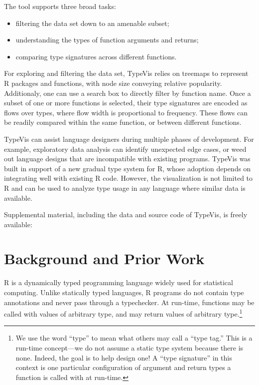 \documentclass{vgtc}                          %
\newcommand{\typevis}{{\sc TypeVis}\xspace}
\begin{document}
The tool supports three broad tasks:
\begin{itemize}
  \setlength\itemsep{0em}
  \item filtering the data set down to an amenable subset;
  \item understanding the types of function arguments and returns;
  \item comparing type signatures across different functions.
\end{itemize}
For exploring and filtering the data set,
\typevis relies on treemaps to represent R packages and functions,
with node size conveying relative popularity.
Additionaly, one can use a search box to directly filter
by function name.
Once a subset of one or more functions is selected,
their type signatures are encoded as flows over types,
where flow width is proportional to frequency.
These flows can be readily compared within the same function,
or between different functions.

\typevis can assist language designers during multiple phases of development.
For example, exploratory data analysis can identify unexpected edge cases,
or weed out language designs that are incompatible with existing programs.
\typevis was built in support of a new gradual type system for R,
whose adoption depends on integrating well with existing R code.
However, the visualization is not limited to R and can be used to
analyze type usage in any language where similar data is available.

Supplemental material, including the data and source code of
\typevis, is freely available: 


\section{Background and Prior Work}

R is a dynamically typed programming language widely used for
statistical computing. Unlike statically typed languages,
R programs do not contain type annotations
and never pass through a typechecker.
At run-time,
functions may be called with values of arbitrary type,
and may return values of arbitrary type.\footnote{
  We use the word ``type'' to mean what others may call a ``type tag.''
  This is a run-time concept---we do not assume a static type system
  because there is none. Indeed, the goal is to help design one!
  A ``type signature'' in this context is one particular configuration
  of argument and return types a function is called with at run-time.
}
\end{document}
